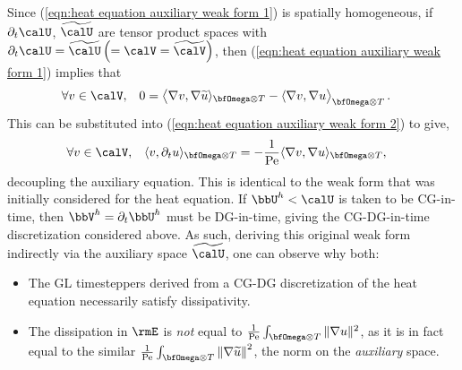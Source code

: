     Since (\ref{eqn:heat equation auxiliary weak form 1}) is spatially homogeneous, if $\partial_{t}\calU$, $\widetilde{\calU}$ are tensor product spaces with $\partial_{t}\calU  =  \widetilde{\calU}  \left(=  \calV  =  \widetilde{\calV}\right)$, then (\ref{eqn:heat equation auxiliary weak form 1}) implies that
    \begin{align}
        &\forall  v  \in  \calV,  &  0  &=  \left\langle\nabla v, \nabla\widetilde{u}\rangle_{\bfOmega\otimes T} - \langle\nabla v, \nabla u\right\rangle_{\bfOmega\otimes T}.
    \end{align}
    This can be substituted into (\ref{eqn:heat equation auxiliary weak form 2}) to give,
    \begin{align}
        &\forall  v  \in  \calV,  &  \langle v, \partial_{t}u\rangle_{\bfOmega\otimes T}  &=  - \frac{1}{\rmPe}\langle\nabla v, \nabla u\rangle_{\bfOmega\otimes T},
    \end{align}
    decoupling the auxiliary equation. This is identical to the weak form that was initially considered for the heat equation. If $\bbU^{h}  <  \calU$ is taken to be CG-in-time, then $\bbV^{h}  =  \partial_{t}\bbU^{h}$ must be DG-in-time, giving the CG-DG-in-time discretization considered above. As such, deriving this original weak form indirectly via the auxiliary space $\widetilde{\calU}$, one can observe why both:
    \begin{itemize}
        \item  The GL timesteppers derived from a CG-DG discretization of the heat equation necessarily satisfy dissipativity.
        \item  The dissipation in $\rmE$ is \emph{not} equal to $\frac{1}{\rmPe}\int_{\bfOmega\otimes T}\|\nabla u\|^{2}$, as it is in fact equal to the similar $\frac{1}{\rmPe}\int_{\bfOmega\otimes T}\left\|\nabla\widetilde{u}\right\|^{2}$, the norm on the \emph{auxiliary} space.
    \end{itemize}
    